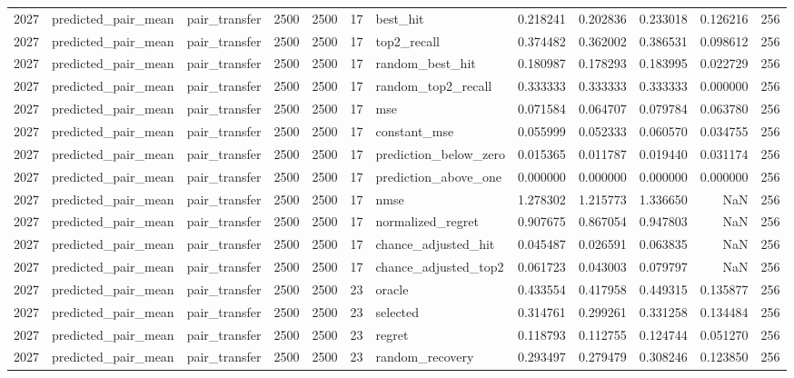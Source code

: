 \begin{tabular}{rllrrrlrrrrr}
2027 & predicted_pair_mean & pair_transfer & 2500 & 2500 & 17 & best_hit & 0.218241 & 0.202836 & 0.233018 & 0.126216 & 256 \\
2027 & predicted_pair_mean & pair_transfer & 2500 & 2500 & 17 & top2_recall & 0.374482 & 0.362002 & 0.386531 & 0.098612 & 256 \\
2027 & predicted_pair_mean & pair_transfer & 2500 & 2500 & 17 & random_best_hit & 0.180987 & 0.178293 & 0.183995 & 0.022729 & 256 \\
2027 & predicted_pair_mean & pair_transfer & 2500 & 2500 & 17 & random_top2_recall & 0.333333 & 0.333333 & 0.333333 & 0.000000 & 256 \\
2027 & predicted_pair_mean & pair_transfer & 2500 & 2500 & 17 & mse & 0.071584 & 0.064707 & 0.079784 & 0.063780 & 256 \\
2027 & predicted_pair_mean & pair_transfer & 2500 & 2500 & 17 & constant_mse & 0.055999 & 0.052333 & 0.060570 & 0.034755 & 256 \\
2027 & predicted_pair_mean & pair_transfer & 2500 & 2500 & 17 & prediction_below_zero & 0.015365 & 0.011787 & 0.019440 & 0.031174 & 256 \\
2027 & predicted_pair_mean & pair_transfer & 2500 & 2500 & 17 & prediction_above_one & 0.000000 & 0.000000 & 0.000000 & 0.000000 & 256 \\
2027 & predicted_pair_mean & pair_transfer & 2500 & 2500 & 17 & nmse & 1.278302 & 1.215773 & 1.336650 & NaN & 256 \\
2027 & predicted_pair_mean & pair_transfer & 2500 & 2500 & 17 & normalized_regret & 0.907675 & 0.867054 & 0.947803 & NaN & 256 \\
2027 & predicted_pair_mean & pair_transfer & 2500 & 2500 & 17 & chance_adjusted_hit & 0.045487 & 0.026591 & 0.063835 & NaN & 256 \\
2027 & predicted_pair_mean & pair_transfer & 2500 & 2500 & 17 & chance_adjusted_top2 & 0.061723 & 0.043003 & 0.079797 & NaN & 256 \\
2027 & predicted_pair_mean & pair_transfer & 2500 & 2500 & 23 & oracle & 0.433554 & 0.417958 & 0.449315 & 0.135877 & 256 \\
2027 & predicted_pair_mean & pair_transfer & 2500 & 2500 & 23 & selected & 0.314761 & 0.299261 & 0.331258 & 0.134484 & 256 \\
2027 & predicted_pair_mean & pair_transfer & 2500 & 2500 & 23 & regret & 0.118793 & 0.112755 & 0.124744 & 0.051270 & 256 \\
2027 & predicted_pair_mean & pair_transfer & 2500 & 2500 & 23 & random_recovery & 0.293497 & 0.279479 & 0.308246 & 0.123850 & 256 \\

\end{tabular}
